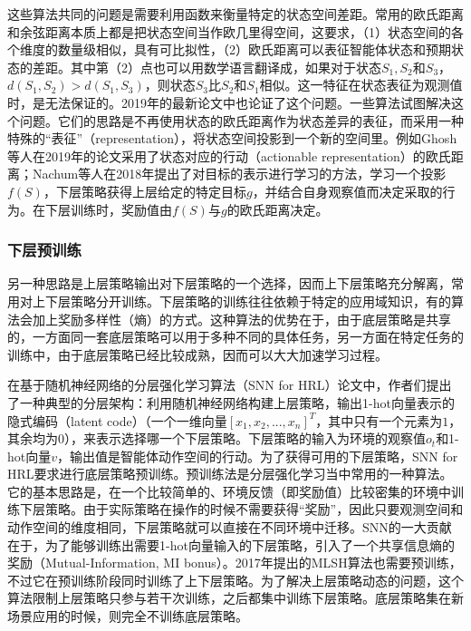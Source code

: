 这些算法共同的问题是需要利用函数来衡量特定的状态空间差距。常用的欧氏距离和余弦距离本质上都是把状态空间当作欧几里得空间，这要求，（1）状态空间的各个维度的数量级相似，具有可比拟性，（2）欧氏距离可以表征智能体状态和预期状态的差距。其中第（2）点也可以用数学语言翻译成，如果对于状态$S_1, S_2$和$S_3$，$d(S_1, S_2) > d(S_1, S_3)$，则状态$S_3$比$S_2$和$S_1$相似。这一特征在状态表征为观测值时，是无法保证的。2019年的最新论文\cite{goal-conditioned}中也论证了这个问题。一些算法试图解决这个问题。它们的思路是不再使用状态的欧氏距离作为状态差异的表征，而采用一种特殊的``表征''（representation），将状态空间投影到一个新的空间里。例如Ghosh等人在2019年的论文\cite{goal-conditioned}采用了状态对应的行动（actionable representation）的欧氏距离；Nachum等人在2018年\cite{goal_repr_learning}提出了对目标的表示进行学习的方法，学习一个投影$f(S)$，下层策略获得上层给定的特定目标$g$，并结合自身观察值而决定采取的行为。在下层训练时，奖励值由$f(S)$与$g$的欧氏距离决定。

\subsubsection{下层预训练}
另一种思路是上层策略输出对下层策略的一个选择，因而上下层策略充分解离，常用对上下层策略分开训练\cite{DIYAN}\cite{SNN4hrl}\cite{Learning_and_Transfer_of_Modulated_Locomotor_Controllers}。下层策略的训练往往依赖于特定的应用域知识，有的算法会加上奖励多样性（熵）的方式。这种算法的优势在于，由于底层策略是共享的，一方面同一套底层策略可以用于多种不同的具体任务，另一方面在特定任务的训练中，由于底层策略已经比较成熟，因而可以大大加速学习过程。

在基于随机神经网络的分层强化学习算法（SNN for HRL\cite{SNN4hrl}）论文中，作者们提出了一种典型的分层架构：利用随机神经网络构建上层策略，输出1-hot向量表示的隐式编码（latent code）（一个一维向量$[x_1, x_2, ..., x_n]^T$，其中只有一个元素为$1$，其余均为$0$），来表示选择哪一个下层策略。下层策略的输入为环境的观察值$o_t$和1-hot向量$v$，输出值是智能体动作空间的行动。为了获得可用的下层策略，SNN for HRL要求进行底层策略预训练。预训练法是分层强化学习当中常用的一种算法。它的基本思路是，在一个比较简单的、环境反馈（即奖励值）比较密集的环境中训练下层策略。由于实际策略在操作的时候不需要获得``奖励''，因此只要观测空间和动作空间的维度相同，下层策略就可以直接在不同环境中迁移。SNN的一大贡献在于，为了能够训练出需要1-hot向量输入的下层策略，引入了一个共享信息熵的奖励（Mutual-Information, MI bonus）。2017年提出的MLSH算法\cite{MLSH}也需要预训练，不过它在预训练阶段同时训练了上下层策略。为了解决上层策略动态的问题，这个算法限制上层策略只参与若干次训练，之后都集中训练下层策略。底层策略集在新场景应用的时候，则完全不训练底层策略。


